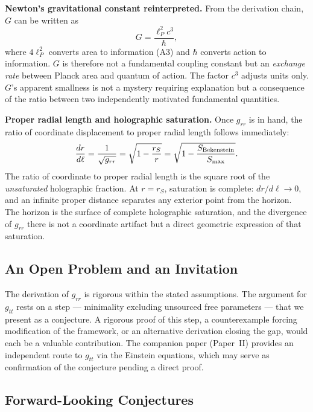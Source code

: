 \documentclass[12pt]{article}
\begin{document}
\medskip
\noindent\textbf{Newton's gravitational constant reinterpreted.}
From the derivation chain, $G$ can be written as
\begin{equation*}
  G = \frac{\ell_P^2 c^3}{\hbar},
\end{equation*}
where $4\ell_P^2$ converts area to information (A3) and $\hbar$
converts action to information.
$G$ is therefore not a fundamental coupling constant but an
\emph{exchange rate} between Planck area and quantum of action.
The factor $c^3$ adjusts units only.
$G$'s apparent smallness is not a mystery requiring explanation but
a consequence of the ratio between two independently motivated
fundamental quantities.

\medskip
\noindent\textbf{Proper radial length and holographic saturation.}
Once $g_{rr}$ is in hand, the ratio of coordinate displacement to
proper radial length follows immediately:
\begin{equation*}
  \frac{dr}{d\ell}
  = \frac{1}{\sqrt{g_{rr}}}
  = \sqrt{1 - \frac{r_S}{r}}
  = \sqrt{1 - \frac{S_{\rm Bekenstein}}{S_{\max}}}.
\end{equation*}
The ratio of coordinate to proper radial length is the square root
of the \emph{unsaturated} holographic fraction.
At $r = r_S$, saturation is complete: $dr/d\ell \to 0$, and an
infinite proper distance separates any exterior point from the horizon.
The horizon is the surface of complete holographic saturation, and the
divergence of $g_{rr}$ there is not a coordinate artifact but a direct
geometric expression of that saturation.

\subsection{An Open Problem and an Invitation}

The derivation of $g_{rr}$ is rigorous within the stated assumptions.
The argument for $g_{tt}$ rests on a step --- minimality excluding
unsourced free parameters --- that we present as a conjecture.
A rigorous proof of this step, a counterexample forcing modification
of the framework, or an alternative derivation closing the gap, would
each be a valuable contribution.
The companion paper (Paper~II) provides an independent route to $g_{tt}$
via the Einstein equations, which may serve as confirmation of the
conjecture pending a direct proof.

\subsection{Forward-Looking Conjectures}
\end{document}
